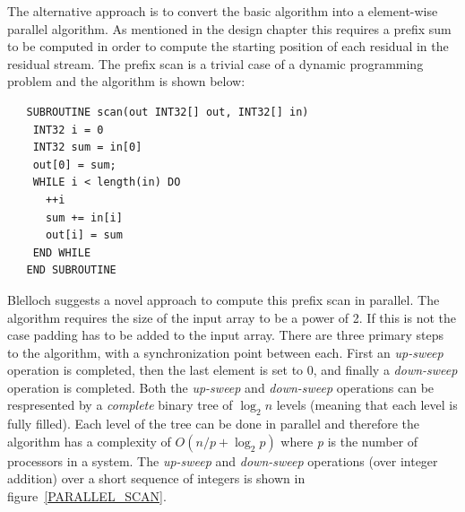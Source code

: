   The alternative approach is to convert the basic algorithm into a element-wise parallel algorithm. As mentioned in the design chapter this requires a prefix sum to be computed 
  in order to compute the starting position of each residual in the residual stream. The prefix scan is a trivial case of a dynamic programming problem and the algorithm 
  \cite{blelloch1990prefix} is shown below:
  \begin{verbatim}
   SUBROUTINE scan(out INT32[] out, INT32[] in)
    INT32 i = 0
    INT32 sum = in[0]
    out[0] = sum;
    WHILE i < length(in) DO
      ++i
      sum += in[i]
      out[i] = sum
    END WHILE
   END SUBROUTINE
  \end{verbatim}
  Blelloch suggests a novel approach \cite{blelloch1990prefix} to compute this prefix scan in parallel. The algorithm requires the size of the input array to
  be a power of 2. If this is not the case padding has to be added to the input array. There are three primary steps to the algorithm, with a synchronization point between each. First
  an \textit{up-sweep} operation is completed, then the last element is set to 0, and finally a \textit{down-sweep} operation is completed. Both the \textit{up-sweep} and \textit{down-sweep} operations
  can be respresented by a \textit{complete} binary tree of $\log_2n$ levels (meaning that each level is fully filled). Each level of the tree can be done in parallel and therefore the algorithm has a 
  complexity of $O(n/p + \log_2{p})$ where \textit{p} is the number of processors in a system. The \textit{up-sweep} and \textit{down-sweep} operations (over integer addition) over a short sequence of integers is shown
  in figure~\ref{PARALLEL_SCAN}.
